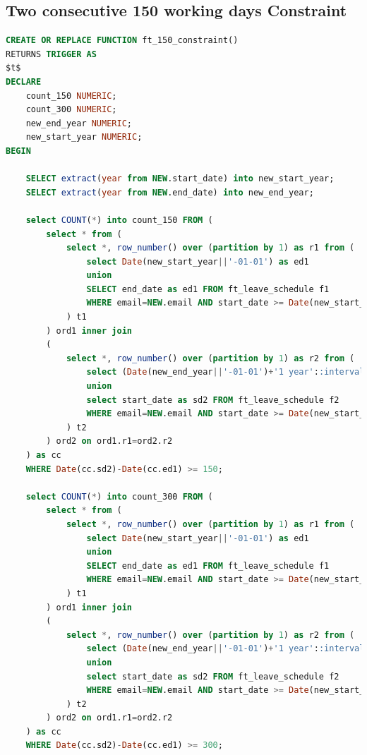 \documentclass[
  paper=a4,
  ,captions=tableheading
]{scrartcl}
\begin{document}
\hypertarget{two-consecutive-150-working-days-constraint}{%
\subsection{Two consecutive 150 working days
Constraint}\label{two-consecutive-150-working-days-constraint}}

\begin{lstlisting}[language=SQL]
CREATE OR REPLACE FUNCTION ft_150_constraint()
RETURNS TRIGGER AS
$t$
DECLARE
    count_150 NUMERIC;
    count_300 NUMERIC;
    new_end_year NUMERIC;
    new_start_year NUMERIC;
BEGIN

    SELECT extract(year from NEW.start_date) into new_start_year;
    SELECT extract(year from NEW.end_date) into new_end_year;

    select COUNT(*) into count_150 FROM (
        select * from (
            select *, row_number() over (partition by 1) as r1 from (
                select Date(new_start_year||'-01-01') as ed1
                union
                SELECT end_date as ed1 FROM ft_leave_schedule f1
                WHERE email=NEW.email AND start_date >= Date(new_start_year||'-01-01') order by ed1 ASC
            ) t1
        ) ord1 inner join
        (
            select *, row_number() over (partition by 1) as r2 from (
                select (Date(new_end_year||'-01-01')+'1 year'::interval - '1 day'::interval) as sd2
                union
                select start_date as sd2 FROM ft_leave_schedule f2
                WHERE email=NEW.email AND start_date >= Date(new_start_year||'-01-01') order by sd2 ASC
            ) t2
        ) ord2 on ord1.r1=ord2.r2
    ) as cc
    WHERE Date(cc.sd2)-Date(cc.ed1) >= 150;

    select COUNT(*) into count_300 FROM (
        select * from (
            select *, row_number() over (partition by 1) as r1 from (
                select Date(new_start_year||'-01-01') as ed1
                union
                SELECT end_date as ed1 FROM ft_leave_schedule f1
                WHERE email=NEW.email AND start_date >= Date(new_start_year||'-01-01') order by ed1 ASC
            ) t1
        ) ord1 inner join
        (
            select *, row_number() over (partition by 1) as r2 from (
                select (Date(new_end_year||'-01-01')+'1 year'::interval - '1 day'::interval) as sd2
                union
                select start_date as sd2 FROM ft_leave_schedule f2
                WHERE email=NEW.email AND start_date >= Date(new_start_year||'-01-01') order by sd2 ASC
            ) t2
        ) ord2 on ord1.r1=ord2.r2
    ) as cc
    WHERE Date(cc.sd2)-Date(cc.ed1) >= 300;


\end{lstlisting}
\end{document}
